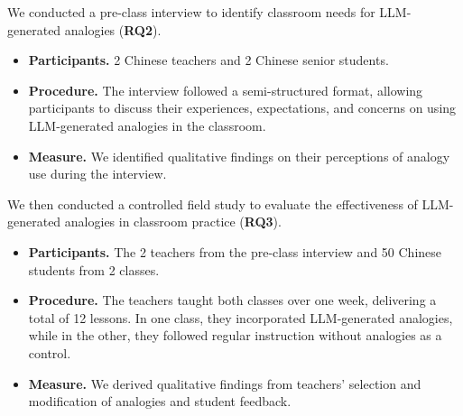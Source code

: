 We conducted a pre-class interview to identify classroom needs for LLM-generated analogies (\textbf{RQ2}).
\begin{itemize}
    \item \textbf{Participants.} 2 Chinese teachers and 2 Chinese senior students.
    \item \textbf{Procedure.} The interview followed a semi-structured format, allowing participants to discuss their experiences, expectations, and concerns on using LLM-generated analogies in the classroom.
    \item \textbf{Measure.} We identified qualitative findings on their perceptions of analogy use during the interview.
\end{itemize}

We then conducted a controlled field study to evaluate the effectiveness of LLM-generated analogies in classroom practice (\textbf{RQ3}).
\begin{itemize}
    \item \textbf{Participants.} The 2 teachers from the pre-class interview and 50 Chinese students from 2 classes.
    \item \textbf{Procedure.} The teachers taught both classes over one week, delivering a total of 12 lessons. In one class, they incorporated LLM-generated analogies, while in the other, they followed regular instruction without analogies as a control.
    \item \textbf{Measure.} We derived qualitative findings from teachers’ selection and modification of analogies and student feedback.
\end{itemize}




